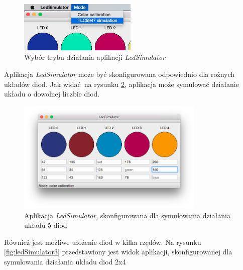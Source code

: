 \documentclass[eng,printmode]{mgr}
\begin{document}
\begin{figure}[!ht]
    \centering
    \includegraphics[width=0.5\textwidth]{Figures/modes.png} 
    \caption{Wybór trybu działania aplikacji \emph{LedSimulator}}
    \label{fig:modes}
\end{figure}

Aplikacja \emph{LedSimulator} może być skonfigurowana odpowiednio dla rożnych układów diod. Jak widać na rysunku \ref{fig:ledSimulator4}, aplikacja może symulować działanie układu o dowolnej liczbie diod.

\begin{figure}[!ht]
    \centering
    \includegraphics[width=0.8\textwidth]{Figures/ledSimulator4.png} 
    \caption{Aplikacja \emph{LedSimulator}, skonfigurowana dla symulowania działania układu 5 diod}
    \label{fig:ledSimulator4}
\end{figure}

Również jest możliwe ułożenie diod w kilka rzędów.
Na rysunku \ref{fig:ledSimulator3} przedstawiony jest widok aplikacji, skonfigurowanej dla symulowania działania układu diod 2x4
\end{document}
